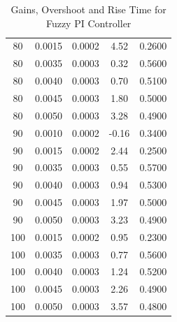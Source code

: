 \documentclass[12pt]{report}
\begin{document}
\begin{table}[H]
\begin{tabular}{|c|c|c|c|c|}
    80      & 0.0015  & 0.0002  &  4.52            & 0.2600 \\
    80      & 0.0035  & 0.0003  &  0.32            & 0.5600 \\
    80      & 0.0040  & 0.0003  &  0.70            & 0.5100 \\
    80      & 0.0045  & 0.0003  &  1.80            & 0.5000 \\
    80      & 0.0050  & 0.0003  &  3.28            & 0.4900 \\
    90      & 0.0010  & 0.0002  & -0.16            & 0.3400 \\
    90      & 0.0015  & 0.0002  &  2.44            & 0.2500 \\
    90      & 0.0035  & 0.0003  &  0.55            & 0.5700 \\
    90      & 0.0040  & 0.0003  &  0.94            & 0.5300 \\
    90      & 0.0045  & 0.0003  &  1.97            & 0.5000 \\
    90      & 0.0050  & 0.0003  &  3.23            & 0.4900 \\
    100     & 0.0015  & 0.0002  &  0.95            & 0.2300 \\
    100     & 0.0035  & 0.0003  &  0.77            & 0.5600 \\
    100     & 0.0040  & 0.0003  &  1.24            & 0.5200 \\
    100     & 0.0045  & 0.0003  &  2.26            & 0.4900 \\
    100     & 0.0050  & 0.0003  &  3.57            & 0.4800 \\
    \hline
    \end{tabular}
    \caption{Gains, Overshoot and Rise Time for Fuzzy PI Controller}
    \label{tab:gains1}
\end{table}
\end{document}
